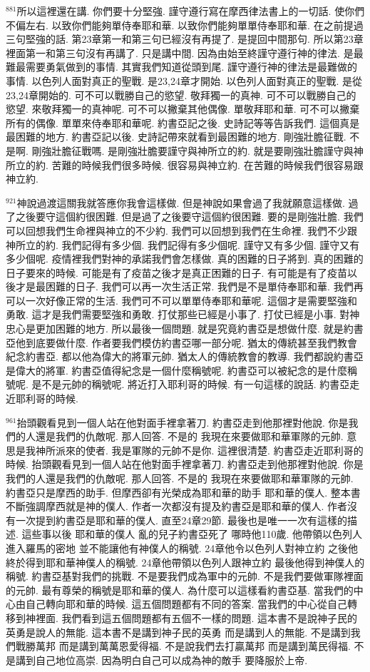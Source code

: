 \documentclass{book}
\begin{document}
$^{881}$所以這裡還在講.
你們要十分堅強.
謹守遵行寫在摩西律法書上的一切話.
使你們不偏左右.
以致你們能夠單侍奉耶和華.
以致你們能夠單單侍奉耶和華.
在之前提過三句堅強的話.
第23章第一和第三句已經沒有再提了.
是提回中間那句.
所以第23章裡面第一和第三句沒有再講了.
只是講中間.
因為由始至終謹守遵行神的律法.
是最難最需要勇氣做到的事情.
其實我們知道從頭到尾.
謹守遵行神的律法是最難做的事情.
以色列人面對真正的聖戰.
是23,24章才開始.
以色列人面對真正的聖戰.
是從23,24章開始的.
可不可以戰勝自己的慾望.
敬拜獨一的真神.
可不可以戰勝自己的慾望.
來敬拜獨一的真神呢.
可不可以撇棄其他偶像.
單敬拜耶和華.
可不可以撇棄所有的偶像.
單單來侍奉耶和華呢.
約書亞記之後.
史詩記等等告訴我們.
這個真是最困難的地方.
約書亞記以後.
史詩記帶來就看到最困難的地方.
剛強壯膽征戰.
不是啊.
剛強壯膽征戰嗎.
是剛強壯膽要謹守與神所立的約.
就是要剛強壯膽謹守與神所立的約.
苦難的時候我們很多時候.
很容易與神立約.
在苦難的時候我們很容易跟神立約.

$^{921}$神說過渡這關我就答應你我會這樣做.
但是神說如果會過了我就願意這樣做.
過了之後要守這個約很困難.
但是過了之後要守這個約很困難.
要的是剛強壯膽.
我們可以回想我們生命裡與神立的不少約.
我們可以回想到我們在生命裡.
我們不少跟神所立的約.
我們記得有多少個.
我們記得有多少個呢.
謹守又有多少個.
謹守又有多少個呢.
疫情裡我們對神的承諾我們會怎樣做.
真的困難的日子將到.
真的困難的日子要來的時候.
可能是有了疫苗之後才是真正困難的日子.
有可能是有了疫苗以後才是最困難的日子.
我們可以再一次生活正常.
我們是不是單侍奉耶和華.
我們再可以一次好像正常的生活.
我們可不可以單單侍奉耶和華呢.
這個才是需要堅強和勇敢.
這才是我們需要堅強和勇敢.
打仗那些已經是小事了.
打仗已經是小事.
對神忠心是更加困難的地方.
所以最後一個問題.
就是究竟約書亞是想做什麼.
就是約書亞他到底要做什麼.
作者要我們模仿約書亞哪一部分呢.
猶太的傳統甚至我們教會紀念約書亞.
都以他為偉大的將軍元帥.
猶太人的傳統教會的教導.
我們都說約書亞是偉大的將軍.
約書亞值得紀念是一個什麼稱號呢.
約書亞可以被紀念的是什麼稱號呢.
是不是元帥的稱號呢.
將近打入耶利哥的時候.
有一句這樣的說話.
約書亞走近耶利哥的時候.

$^{961}$抬頭觀看見到一個人站在他對面手裡拿著刀.
約書亞走到他那裡對他說.
你是我們的人還是我們的仇敵呢.
那人回答.
不是的 我現在來要做耶和華軍隊的元帥.
意思是我神所派來的使者.
我是軍隊的元帥不是你.
這裡很清楚.
約書亞走近耶利哥的時候.
抬頭觀看見到一個人站在他對面手裡拿著刀.
約書亞走到他那裡對他說.
你是我們的人還是我們的仇敵呢.
那人回答.
不是的 我現在來要做耶和華軍隊的元帥.
約書亞只是摩西的助手.
但摩西卻有光榮成為耶和華的助手 耶和華的僕人.
整本書不斷強調摩西就是神的僕人.
作者一次都沒有提及約書亞是耶和華的僕人.
作者沒有一次提到約書亞是耶和華的僕人.
直至24章29節.
最後也是唯一一次有這樣的描述.
這些事以後 耶和華的僕人 亂的兒子約書亞死了 哪時他110歲.
他帶領以色列人進入羅馬的密地 並不能讓他有神僕人的稱號.
24章他令以色列人對神立約 之後他終於得到耶和華神僕人的稱號.
24章他帶領以色列人跟神立約 最後他得到神僕人的稱號.
約書亞基對我們的挑戰.
不是要我們成為軍中的元帥.
不是我們要做軍隊裡面的元帥.
最有尊榮的稱號是耶和華的僕人.
為什麼可以這樣看約書亞基.
當我們的中心由自己轉向耶和華的時候.
這五個問題都有不同的答案.
當我們的中心從自己轉移到神裡面.
我們看到這五個問題都有五個不一樣的問題.
這本書不是說神子民的英勇是說人的無能.
這本書不是講到神子民的英勇 而是講到人的無能.
不是講到我們戰勝萬邦 而是講到萬萬恩愛得福.
不是說我們去打贏萬邦 而是講到萬民得福.
不是講到自己地位高崇.
因為明白自己可以成為神的敵手 要降服於上帝.
\end{document}
